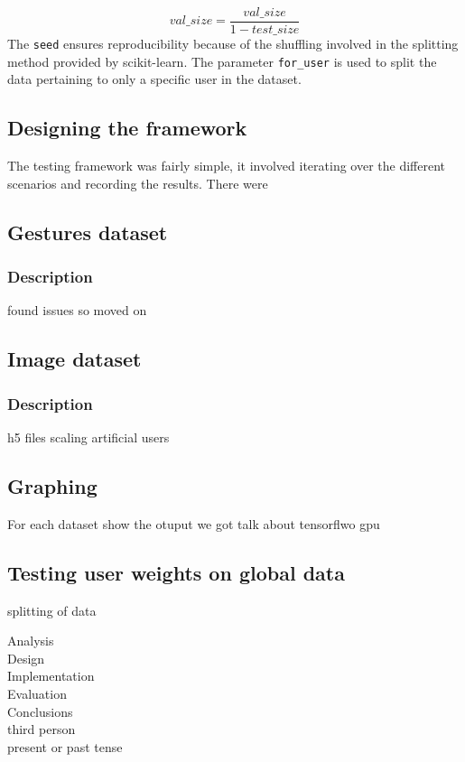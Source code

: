 \documentclass[12pt]{article}
\begin{document}
\begin{equation}\label{eq:val_size}
	val\_size = \frac{val\_size}{1-test\_size}
\end{equation}
The \texttt{seed} ensures reproducibility because of the shuffling involved in the splitting method provided by scikit-learn. The parameter \texttt{for\_user} is used to split the data pertaining to only a specific user in the dataset.


\subsection{Designing the framework}
The testing framework was fairly simple, it involved iterating over the different scenarios and recording the results. There were 
\subsection{Gestures dataset}\label{subsec:gestureset}
\subsubsection{Description}
found issues so moved on
\subsection{Image dataset}\label{subsec:imageset}
\subsubsection{Description}
h5 files
scaling
artificial users
\clearpage
\subsection{Graphing}
For each dataset show the otuput we got
talk about tensorflwo gpu
\subsection{Testing user weights on global data}
splitting of data 

Analysis\\
Design\\
Implementation\\
Evaluation\\
Conclusions\\

third person
\\
present or past tense
\end{document}
